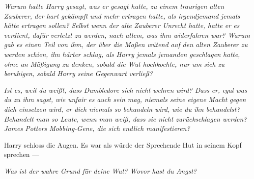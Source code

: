 \emph{Warum hatte Harry gesagt, was er gesagt hatte, zu einem traurigen alten Zauberer,} \emph{der hart gekämpft und mehr ertragen hatte, als irgendjemand jemals hätte ertragen sollen?} \emph{Selbst wenn der alte Zauberer Unrecht hatte, hatte er es verdient, dafür verletzt zu werden, nach allem, was ihm widerfahren war? Warum gab es einen Teil von ihm, der über die Maßen wütend auf den alten Zauberer zu werden schien, ihn härter schlug, als Harry jemals jemanden geschlagen hatte, ohne an Mäßigung zu denken, sobald die Wut hochkochte, nur um sich zu beruhigen, sobald Harry seine Gegenwart verließ?}

\emph{Ist es, weil du weißt, dass Dumbledore sich nicht wehren wird? Dass er, egal was du zu ihm sagst, wie unfair es auch sein mag, niemals seine eigene Macht gegen dich einsetzen wird, er dich niemals so behandeln wird, wie du ihn behandelst? Behandelt man so Leute, wenn man weiß, dass sie nicht zurückschlagen werden? James Potters Mobbing-Gene, die sich endlich manifestieren?}

Harry schloss die Augen.
%
Es war als würde der Sprechende Hut in seinem Kopf sprechen —


\emph{Was ist der wahre Grund für deine Wut? Wovor hast du Angst?}


